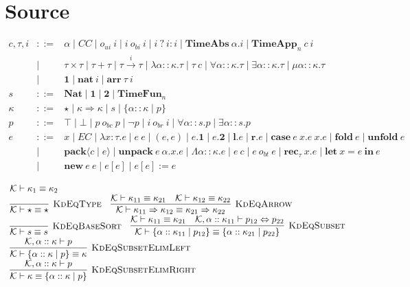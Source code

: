 \documentclass[fleqn]{article}
\begin{document}
\section{Source}

\[
\begin{array}{rcl}
    c,\tau,i & ::= & \alpha \mid CC \mid o_{ui}~i \mid i~o_{bi}~i \mid i~?~i:i \mid \mathbf{TimeAbs}~\alpha. i \mid \mathbf{TimeApp}_n~c~i \\
    & \mid & \tau \times \tau \mid \tau + \tau \mid \tau \xrightarrow{i} \tau \mid \lambda \alpha :: \kappa. \tau \mid \tau~c \mid \forall \alpha :: \kappa. \tau \mid \exists \alpha :: \kappa. \tau \mid \mu \alpha :: \kappa. \tau \\
    & \mid & \mathbf{1} \mid \mathbf{nat}~i \mid \mathbf{arr}~\tau~i \\
    s & ::= & \mathbf{Nat} \mid \mathbf{1} \mid \mathbf{2} \mid \mathbf{TimeFun}_n \\
    \kappa & ::= & \star \mid \kappa \Rightarrow \kappa \mid s \mid \{ \alpha :: \kappa \mid p \} \\
    p & ::= & \top \mid \bot \mid p~o_{bc}~p \mid \neg p \mid i~o_{br}~i \mid \forall \alpha :: s. p \mid \exists \alpha :: s. p \\
    e & ::= & x \mid EC \mid \lambda x:\tau. e \mid e~e \mid (e,e) \mid e.\mathbf{1} \mid e.\mathbf{2} \mid \mathbf{l}.e \mid \mathbf{r}.e \mid \mathbf{case}~e~x.e~x.e \mid \mathbf{fold}~e \mid \mathbf{unfold}~e \\
    & \mid & \mathbf{pack}\langle c \mid e \rangle \mid \mathbf{unpack}~e~\alpha.x.e \mid \Lambda \alpha :: \kappa. e \mid e~c \mid e~o_{bt}~e \mid \mathbf{rec}_\tau~x.e \mid \mathbf{let}~x=e~\mathbf{in}~e \\
    & \mid & \mathbf{new}~e~e \mid e[e] \mid e[e] := e
\end{array}
\]

\[
\begin{array}{l}
    \mathcal{K} \vdash \kappa_1 \equiv \kappa_2 \\
    \infer[\textsc{KdEqType}]{\mathcal{K} \vdash \star \equiv \star}{} \hspace{1em}
    \infer[\textsc{KdEqArrow}]{\mathcal{K} \vdash \kappa_{11} \Rightarrow \kappa_{12} \equiv \kappa_{21} \Rightarrow \kappa_{22}}{\mathcal{K} \vdash \kappa_{11} \equiv \kappa_{21} & \mathcal{K} \vdash \kappa_{12} \equiv \kappa_{22}} \\
    \infer[\textsc{KdEqBaseSort}]{\mathcal{K} \vdash s \equiv s}{} \hspace{1em}
    \infer[\textsc{KdEqSubset}]{\mathcal{K} \vdash \{ \alpha :: \kappa_{11} \mid p_{12} \} \equiv \{ \alpha :: \kappa_{21} \mid p_{22} \}}{\mathcal{K} \vdash \kappa_{11} \equiv \kappa_{21} & \mathcal{K}, \alpha :: \kappa_{11} \vdash p_{12} \Leftrightarrow p_{22}} \\
    \infer[\textsc{KdEqSubsetElimLeft}]{\mathcal{K} \vdash \{ \alpha :: \kappa \mid p \} \equiv \kappa}{\mathcal{K},\alpha :: \kappa \vdash p} \\
    \infer[\textsc{KdEqSubsetElimRight}]{\mathcal{K} \vdash \kappa \equiv \{ \alpha :: \kappa \mid p \}}{\mathcal{K},\alpha :: \kappa \vdash p}
\end{array}
\]
\end{document}
